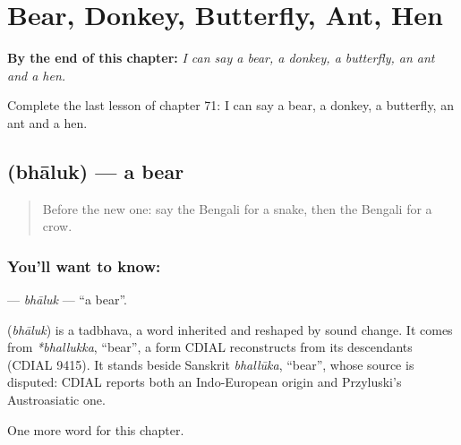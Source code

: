 
\chapter{Bear, Donkey, Butterfly, Ant, Hen}
\label{ch:bn-bear-donkey-butterfly-ant-hen}

\begin{chapteropening}
\textbf{By the end of this chapter:} \emph{I can say a bear, a donkey, a butterfly, an ant and a hen.}

Complete the last lesson of chapter 71: I can say a bear, a donkey, a butterfly, an ant and a hen.
\end{chapteropening}

\section[\texorpdfstring{\bn{ভালুক} (bhāluk)}{ভালুক (bhāluk)}]{ (bhāluk) — a bear}

\label{lesson:BN-C71-bhaluk}



\begin{quote}
Before the new one: say the Bengali for a snake, then the Bengali for a crow.
\end{quote}

\subsection*{You'll want to know: }
\textbf{} — \emph{bhāluk} — \textquotedblleft{}a bear\textquotedblright{}.

\begin{cousinweb}
\textbf{} (\emph{bhāluk}) is a tadbhava, a word inherited and reshaped by sound change. It comes from \emph{*bhallukka}, \textquotedblleft{}bear\textquotedblright{}, a form CDIAL reconstructs from its descendants (CDIAL 9415). It stands beside Sanskrit \emph{bhallūka}, \textquotedblleft{}bear\textquotedblright{}, whose source is disputed: CDIAL reports both an Indo-European origin and Przyluski's Austroasiatic one.
\end{cousinweb}

\begin{grammarlens}[title={What you've built}]
One more word for this chapter.
\end{grammarlens}

